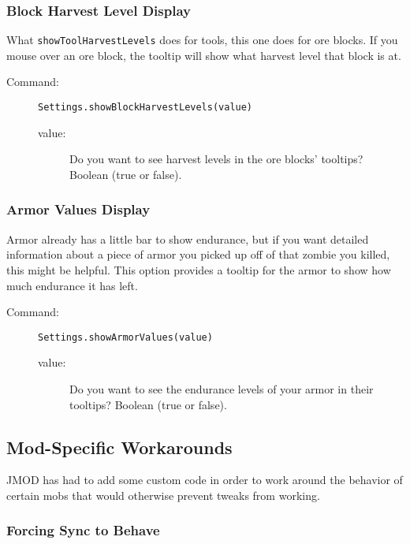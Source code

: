 \documentclass[letterpaper,titlepage,12pt]{article}
\begin{document}
\begin{description}
\subsubsection{Block Harvest Level Display}

What \texttt{showToolHarvestLevels} does for tools, this one does for ore blocks.  If you mouse over an ore block, the tooltip will show what harvest level that block is at.

\begin{description}
\item[Command:] \texttt{Settings.showBlockHarvestLevels(value)}
\begin{description}
\item [value:] Do you want to see harvest levels in the ore blocks' tooltips?  Boolean (true or false).
\end{description}
\end{description}

\subsubsection{Armor Values Display}

Armor already has a little bar to show endurance, but if you want detailed information about a piece of armor you picked up off of that zombie you killed, this might be helpful.  This option provides a tooltip for the armor to show how much endurance it has left.

\begin{description}
\item[Command:] \texttt{Settings.showArmorValues(value)}
\begin{description}
\item [value:] Do you want to see the endurance levels of your armor in their tooltips?  Boolean (true or false).
\end{description}
\end{description}

\subsection{Mod-Specific Workarounds}

JMOD has had to add some custom code in order to work around the behavior of certain mobs that would otherwise prevent tweaks from working.

\subsubsection{Forcing Sync to Behave}


\end{description}
\end{document}

